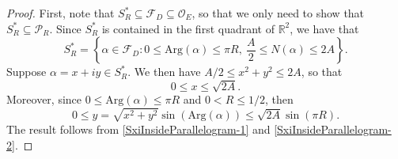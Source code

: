 \documentclass[11pt]{amsart}
\newcommand{\bigo}{\mathcal{O}}
\newcommand{\R}{\mathbb{R}}
\theoremstyle{definition}
\theoremstyle{remark}
\begin{document}
\begin{proof}
First, note that $S_{R}^{*} \subseteq \mathcal{F}_{D} \subseteq \bigo_E$, so that we only need to show that $S_{R}^{*} \subseteq \mathcal{P}_{R}$. Since $S_{R}^{*}$ is contained in the first quadrant of $\R^2$, we have that $$ S_{R}^{*} = \left\{ \alpha\in \mathcal{F}_{D} : 0\leq \mathrm{Arg}(\alpha) \leq \pi R, \: \frac{A}{2} \leq N(\alpha) \leq 2A \right\}.$$ Suppose $\alpha = x+iy \in S_{R}^{*}$. We then have $A/2 \leq x^2+y^2 \leq 2A$, so that
\begin{equation}
    0\leq x\leq \sqrt{2A}. \label{SxiInsideParallelogram-1}
\end{equation} 
Moreover, since $0\leq \mathrm{Arg}(\alpha) \leq \pi R$ and $0<R\leq 1/2$, then 
\begin{equation}
    0\leq y = \sqrt{x^2+y^2} \sin(\mathrm{Arg}(\alpha)) \leq \sqrt{2A} \sin(\pi R). \label{SxiInsideParallelogram-2}
\end{equation}
The result follows from \eqref{SxiInsideParallelogram-1} and \eqref{SxiInsideParallelogram-2}.
\end{proof}
\end{document}
